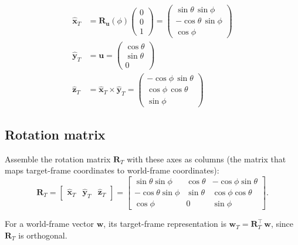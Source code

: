 \documentclass[12pt,a4paper]{article}
\begin{document}
\begin{align}
  \hat{\mathbf{x}}_T &=
  \mathbf{R}_{\mathbf{u}}(\phi)
  \begin{pmatrix} 0 \\ 0 \\ 1 \end{pmatrix}
  = \begin{pmatrix}
      \sin\theta\,\sin\phi \\
      -\cos\theta\,\sin\phi \\
      \cos\phi
    \end{pmatrix}
  \label{eq:x-target} \\[8pt]
  \hat{\mathbf{y}}_T &= \mathbf{u}
  = \begin{pmatrix} \cos\theta \\ \sin\theta \\ 0 \end{pmatrix}
  \label{eq:y-target} \\[8pt]
  \hat{\mathbf{z}}_T &= \hat{\mathbf{x}}_T \times \hat{\mathbf{y}}_T
  = \begin{pmatrix}
      -\cos\phi\,\sin\theta \\
      \cos\phi\,\cos\theta \\
      \sin\phi
    \end{pmatrix}
  \label{eq:z-target}
\end{align}

\subsection{Rotation matrix}

Assemble the rotation matrix $\mathbf{R}_T$ with these axes as columns
(the matrix that maps target-frame coordinates to world-frame coordinates):
\begin{equation}\label{eq:R}
  \mathbf{R}_T
  = \begin{bmatrix}
      \hat{\mathbf{x}}_T & \hat{\mathbf{y}}_T & \hat{\mathbf{z}}_T
    \end{bmatrix}
  = \begin{bmatrix}
      \sin\theta\sin\phi     & \cos\theta & -\cos\phi\sin\theta \\[2pt]
      -\cos\theta\sin\phi    & \sin\theta & \cos\phi\cos\theta \\[2pt]
      \cos\phi               & 0          & \sin\phi
    \end{bmatrix}.
\end{equation}

For a world-frame vector $\mathbf{w}$, its target-frame representation is
$\mathbf{w}_T = \mathbf{R}_T^{\top}\,\mathbf{w}$, since $\mathbf{R}_T$ is
orthogonal.
\end{document}
